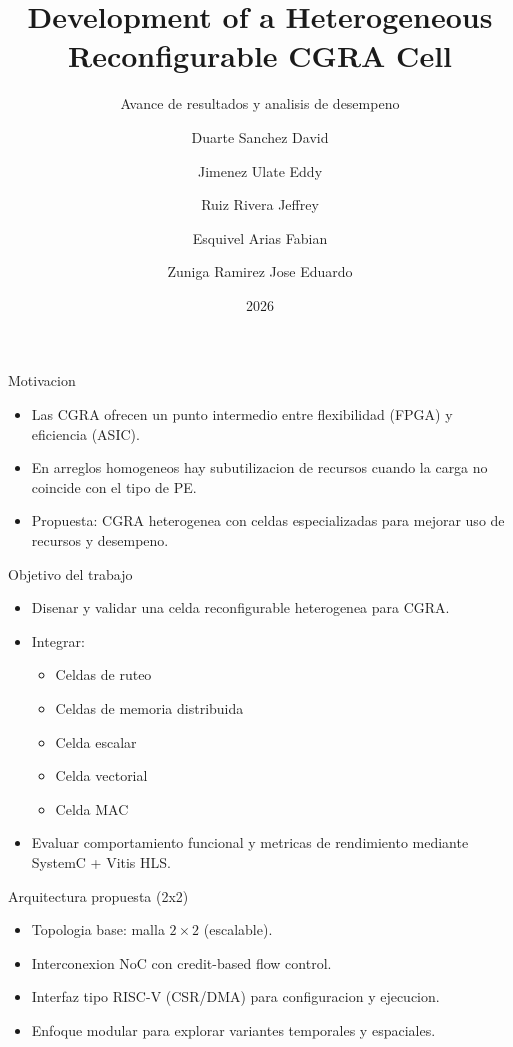 \documentclass[aspectratio=169]{beamer}
\title{Development of a Heterogeneous Reconfigurable CGRA Cell}
\subtitle{Avance de resultados y analisis de desempeno}
\author{
Duarte Sanchez David \and
Jimenez Ulate Eddy \and
Ruiz Rivera Jeffrey \and
Esquivel Arias Fabian \and
Zuniga Ramirez Jose Eduardo
}
\institute{Escuela de Ingenieria en Electronica \\ Instituto Tecnologico de Costa Rica}
\date{2026}
\begin{document}
\begin{frame}
  \titlepage
\end{frame}

\begin{frame}{Motivacion}
\begin{itemize}
  \item Las CGRA ofrecen un punto intermedio entre flexibilidad (FPGA) y eficiencia (ASIC).
  \item En arreglos homogeneos hay subutilizacion de recursos cuando la carga no coincide con el tipo de PE.
  \item Propuesta: CGRA heterogenea con celdas especializadas para mejorar uso de recursos y desempeno.
\end{itemize}
\end{frame}

\begin{frame}{Objetivo del trabajo}
\begin{itemize}
  \item Disenar y validar una celda reconfigurable heterogenea para CGRA.
  \item Integrar:
  \begin{itemize}
    \item Celdas de ruteo
    \item Celdas de memoria distribuida
    \item Celda escalar
    \item Celda vectorial
    \item Celda MAC
  \end{itemize}
  \item Evaluar comportamiento funcional y metricas de rendimiento mediante SystemC + Vitis HLS.
\end{itemize}
\end{frame}

\begin{frame}{Arquitectura propuesta (2x2)}
\begin{itemize}
  \item Topologia base: malla $2\times2$ (escalable).
  \item Interconexion NoC con credit-based flow control.
  \item Interfaz tipo RISC-V (CSR/DMA) para configuracion y ejecucion.
  \item Enfoque modular para explorar variantes temporales y espaciales.
\end{itemize}
\end{frame}
\end{document}
